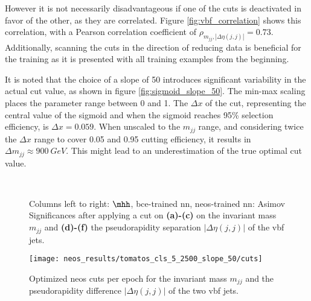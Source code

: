 However it is not necessarily disadvantageous if one of the cuts is deactivated in favor of the other, as they are correlated. Figure \ref{fig:vbf_correlation} shows this correlation, with a Pearson correlation coefficient of $\rho_{m_{jj},|\Delta\eta(j,j)|}=0.73$. Additionally, scanning the cuts in the direction of reducing data is beneficial for the training as it is presented with all training examples from the beginning.

It is noted that the choice of a slope of 50 introduces significant variability in the actual cut value, as shown in figure \ref{fig:sigmoid_slope_50}. The min-max scaling places the parameter range between 0 and 1. The $\Delta x$ of the cut, representing the central value of the sigmoid and when the sigmoid reaches 95\% selection efficiency, is $\Delta x=0.059$. When unscaled to the $m_{jj}$ range, and considering twice the $\Delta x$ range to cover 0.05 and 0.95 cutting efficiency, it results in $\Delta m_{jj}\approx \qty[]{900}{GeV}$. This might lead to an underestimation of the true optimal cut value.

\begin{figure}
    \centering
    \\
    \caption[]{Columns left to right: $\mhh$, \ac{bce}-trained \ac{nn}, \ac{neos}-trained \ac{nn}: Asimov Significances after applying a cut on \textbf{(a)-(c)} on the invariant mass $m_{jj}$ and \textbf{(d)-(f)} the pseudorapidity separation $|\Delta\eta(j,j)|$ of the \ac{vbf} jets. }
    \label{fig:cut_scan}
\end{figure}

\begin{figure}
    \centering
    \texttt{[image: neos\_results/tomatos\_cls\_5\_2500\_slope\_50/cuts]}
    \caption[]{Optimized \ac{neos} cuts per epoch for the invariant mass $m_{jj}$ and the pseudorapidity difference $|\Delta\eta(j,j)|$ of the two \ac{vbf} jets.}
    \label{fig:neos_cuts}
\end{figure}

